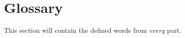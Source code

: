 \newpage
\section{Glossary}
\genHeader

This section will contain the defined words from \emph{every} part.